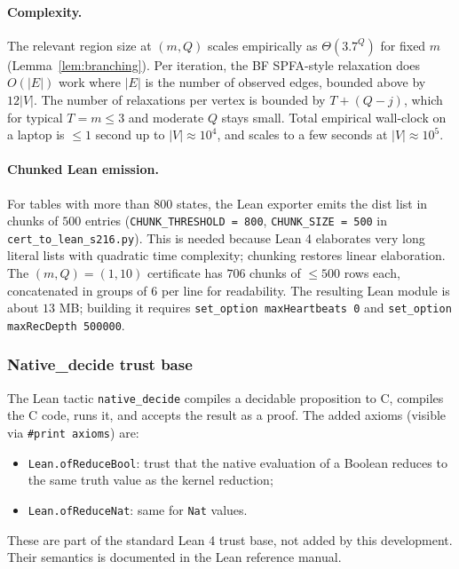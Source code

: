 \documentclass[11pt,a4paper]{article}
\theoremstyle{plain}
\theoremstyle{definition}
\begin{document}
\paragraph{Complexity.}
The relevant region size at $(m, Q)$ scales empirically as
$\Theta(3.7^Q)$ for fixed $m$ (Lemma~\ref{lem:branching}). Per
iteration, the BF SPFA-style relaxation does $O(|E|)$ work where
$|E|$ is the number of observed edges, bounded above by $12 |V|$.
The number of relaxations per vertex is bounded by $T + (Q - j)$,
which for typical $T = m \le 3$ and moderate $Q$ stays small. Total
empirical wall-clock on a laptop is $\le 1$ second up to
$|V| \approx 10^4$, and scales to a few seconds at $|V| \approx 10^5$.

\paragraph{Chunked Lean emission.}
For tables with more than $800$ states, the Lean exporter emits
the dist list in chunks of $500$ entries
(\texttt{CHUNK\_THRESHOLD = 800}, \texttt{CHUNK\_SIZE = 500} in
\texttt{cert\_to\_lean\_s216.py}). This is needed because Lean 4
elaborates very long literal lists with quadratic time complexity;
chunking restores linear elaboration. The $(m, Q) = (1, 10)$
certificate has $706$ chunks of $\le 500$ rows each, concatenated
in groups of $6$ per line for readability. The resulting Lean
module is about $13$ MB; building it requires
\texttt{set\_option maxHeartbeats 0} and
\texttt{set\_option maxRecDepth 500000}.

\subsubsection*{Native\_decide trust base}

The Lean tactic \texttt{native\_decide} compiles a decidable
proposition to C, compiles the C code, runs it, and accepts the
result as a proof. The added axioms (visible via
\texttt{\#print axioms}) are:
\begin{itemize}
  \item \texttt{Lean.ofReduceBool}: trust that the native
        evaluation of a Boolean reduces to the same truth value
        as the kernel reduction;
  \item \texttt{Lean.ofReduceNat}: same for \texttt{Nat} values.
\end{itemize}
These are part of the standard Lean 4 trust base, not added by
this development. Their semantics is documented in the Lean
reference manual.
\end{document}
